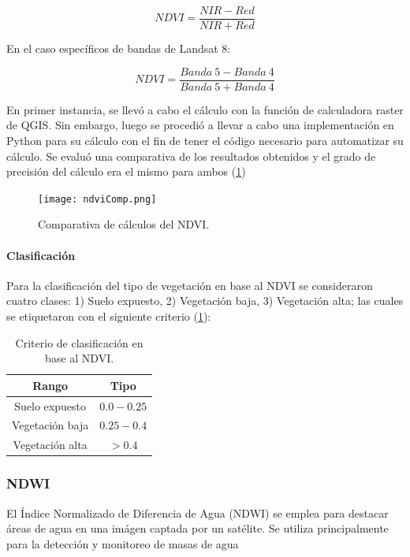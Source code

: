 $$NDVI=\frac{NIR-Red}{NIR+Red}$$

En el caso específicos de bandas de Landsat 8:

$$NDVI=\frac{Banda~5 - Banda~4}{Banda~5 + Banda~4}$$

En primer instancia, se llevó a cabo el cálculo con la función de calculadora raster de QGIS. Sin embargo, luego se procedió a llevar a cabo una implementación en Python para su cálculo con el fin de tener el código necesario para automatizar su cálculo. Se evaluó una comparativa de los resultados obtenidos y el grado de precisión del cálculo era el mismo para ambos (\figurename \ref{fig:ndvi-comp})

\begin{figure}[H]
	\texttt{[image: ndviComp.png]}
	\centering
	\caption{Comparativa de cálculos del NDVI.}
	\label{fig:ndvi-comp}
\end{figure}

\paragraph{Clasificación} \label{clasificacion}

Para la clasificación del tipo de vegetación en base al NDVI se consideraron cuatro clases: 1) Suelo expuesto, 2) Vegetación baja, 3) Vegetación alta; las cuales se etiquetaron con el siguiente criterio (\tablename    \ref{table:ndvi-criterio}): 

\onehalfspacing
\begin{table}[H]
\begin{center}
	\begin{tabular}{|c | c |} 
		\hline
		\textbf{Rango} & \textbf{Tipo}\\
		\hline
		Suelo expuesto & $0.0-0.25$ \\
		\hline
		Vegetación baja & $0.25-0.4$ \\
		\hline
		Vegetación alta & $> 0.4$ \\
		\hline
	\end{tabular}
\end{center}
\caption{Criterio de clasificación en base al NDVI.}
\label{table:ndvi-criterio}
\end{table}
\singlespacing

\subsubsection{NDWI}

El Índice Normalizado de Diferencia de Agua (NDWI) se emplea para destacar áreas de agua en una imágen captada por un satélite. Se utiliza principalmente para la detección y monitoreo de masas de agua

